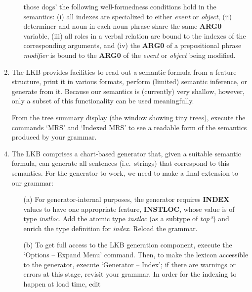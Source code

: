 \documentclass[10pt]{article}
\newcommand{\att}[1]{{\mbox{\scriptsize {\bf #1}}}}
\begin{document}
\begin{enumerate}
\begin{itemize}
                those dogs' the following well-formedness conditions
                hold in the semantics: (i) all indexes are specialized to
                either {\it event} or {\it object}, (ii) determiner
                and noun in each noun phrase share the same \att{ARG0}
                variable, (iii) all roles in a verbal relation are
                bound to the indexes of the corresponding arguments,
                and (iv) the \att{ARG0} of a prepositional phrase 
                {\em modifier\/} is bound to the \att{ARG0} of the
                {\it event} or {\it object} being modified.
        \end{itemize}
  \item The LKB provides facilities to read out a semantic formula from
        a feature structure, print it in various formats, perform
        (limited) semantic inference, or generate from it.  Because our
        semantics is (currently) very shallow, however, only a subset
        of this functionality can be used meaningfully.
  \item []
        From the tree summary display (the window showing tiny trees),
        execute the commands `MRS' and `Indexed MRS' to see a readable
        form of the semantics produced by your grammar.
  \item 
        The LKB comprises a chart-based generator that, given a
        suitable semantic formula, can generate all sentences (i.e.\
        strings) that correspond to this semantics.  
        For the generator to work, we need to make a final extension to
        our grammar:
        \begin{itemize}
          \item [(a)]
                For generator-internal purposes, the generator requires
                \att{INDEX} values to have one appropriate feature,
                \att{INSTLOC}, whose value is of type {\it instloc}.
                Add the atomic type {\it instloc} (as a subtype of
                {\it *top*}) and enrich the type definition for
                {\it index}.  Reload the grammar.
          \item [(b)]
                To get full access to the LKB generation component,
                execute the `Options -- Expand Menu' command.  Then, to
                make the lexicon accessible to the generator, execute
                `Generator -- Index'; if there are warnings or errors
                at this stage, revisit your grammar.
                In order for the indexing to happen at load time, edit

\end{itemize}
\end{enumerate}
\end{document}
